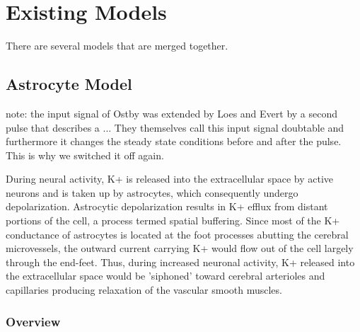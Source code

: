 \section{Existing Models}
There are several models that are merged together.

\subsection{Astrocyte Model}
note: the input signal of Ostby was extended by Loes and Evert by a second pulse that describes a ... They themselves call this input signal doubtable and furthermore it changes the steady state conditions before and after the pulse. This is why we switched it off again.


\cite{Iadecola1993} During neural activity, K+ is released into the extracellular space by active neurons and is taken up by astrocytes, which consequently undergo depolarization. Astrocytic depolarization results in K+ efflux from distant portions of the cell, a process termed spatial buffering. Since most of the K+ conductance of astrocytes is located at the foot processes abutting the cerebral microvessels, the outward current carrying K+ would flow out of the cell largely through the end-feet. Thus, during increased neuronal activity, K+ released into the extracellular space would be 'siphoned' toward cerebral arterioles and capillaries producing relaxation of the vascular smooth muscles.
\subsubsection{Overview}



